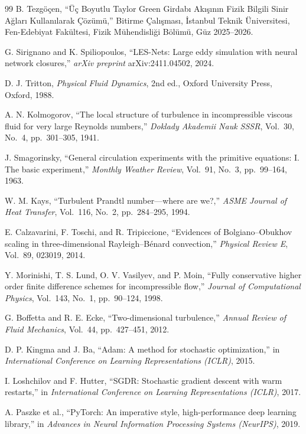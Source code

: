 \begin{thebibliography}{99}
B. Tezgöçen,
``Üç Boyutlu Taylor Green Girdabı Akışının Fizik Bilgili Sinir Ağları Kullanılarak Çözümü,''
Bitirme Çalışması, İstanbul Teknik Üniversitesi, Fen-Edebiyat Fakültesi,
Fizik Mühendisliği Bölümü, Güz 2025--2026.

G. Sirignano and K. Spiliopoulos,
``LES-Nets: Large eddy simulation with neural network closures,''
\textit{arXiv preprint} arXiv:2411.04502, 2024.

D. J. Tritton,
\textit{Physical Fluid Dynamics},
2nd ed., Oxford University Press, Oxford, 1988.

A. N. Kolmogorov,
``The local structure of turbulence in incompressible viscous fluid for very large Reynolds numbers,''
\textit{Doklady Akademii Nauk SSSR}, Vol.~30, No.~4, pp.~301--305, 1941.

J. Smagorinsky,
``General circulation experiments with the primitive equations: I. The basic experiment,''
\textit{Monthly Weather Review}, Vol.~91, No.~3, pp.~99--164, 1963.

W. M. Kays,
``Turbulent Prandtl number---where are we?,''
\textit{ASME Journal of Heat Transfer}, Vol.~116, No.~2, pp.~284--295, 1994.

E. Calzavarini, F. Toschi, and R. Tripiccione,
``Evidences of Bolgiano--Obukhov scaling in three-dimensional Rayleigh--B\'enard convection,''
\textit{Physical Review E}, Vol.~89, 023019, 2014.

Y. Morinishi, T. S. Lund, O. V. Vasilyev, and P. Moin,
``Fully conservative higher order finite difference schemes for incompressible flow,''
\textit{Journal of Computational Physics}, Vol.~143, No.~1, pp.~90--124, 1998.

G. Boffetta and R. E. Ecke,
``Two-dimensional turbulence,''
\textit{Annual Review of Fluid Mechanics}, Vol.~44, pp.~427--451, 2012.

D. P. Kingma and J. Ba,
``Adam: A method for stochastic optimization,''
in \textit{International Conference on Learning Representations (ICLR)}, 2015.

I. Loshchilov and F. Hutter,
``SGDR: Stochastic gradient descent with warm restarts,''
in \textit{International Conference on Learning Representations (ICLR)}, 2017.

A. Paszke et al.,
``PyTorch: An imperative style, high-performance deep learning library,''
in \textit{Advances in Neural Information Processing Systems (NeurIPS)}, 2019.

\end{thebibliography}
